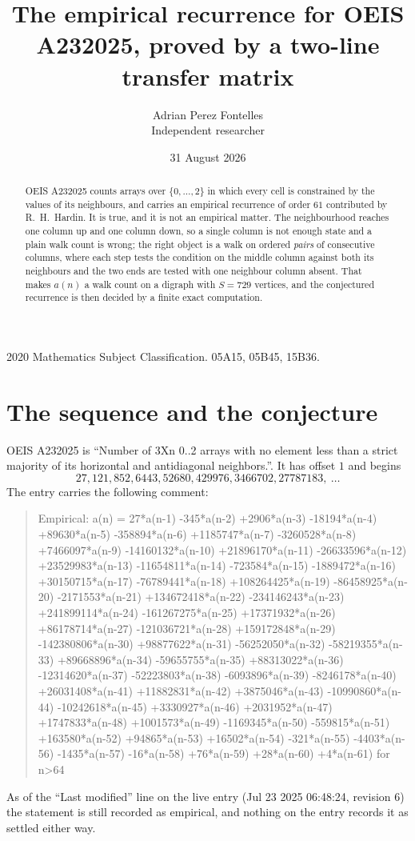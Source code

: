 \documentclass[11pt,a4paper]{article}
\title{The empirical recurrence for OEIS A232025, proved by a two-line transfer matrix}
\author{Adrian Perez Fontelles\\ \small Independent researcher}
\date{31 August 2026}
\theoremstyle{plain}
\theoremstyle{definition}
\begin{document}
\maketitle

\begin{abstract}
OEIS A232025 counts arrays over $\{0,\dots,2\}$ in which every cell is constrained by the
values of its neighbours, and carries an empirical recurrence of order $61$ contributed
by R.~H.~Hardin. It is true, and it is not an empirical matter. The neighbourhood reaches one
column up and one column down, so a single column is not enough state and a plain walk count
is wrong; the right object is a walk on ordered \emph{pairs} of consecutive columns, where
each step tests the condition on the middle column against both its neighbours and the two
ends are tested with one neighbour column absent. That makes $a(n)$ a walk count on a digraph
with $S=729$ vertices, and the conjectured recurrence is then decided by a finite exact
computation.
\end{abstract}

\noindent\small 2020 Mathematics Subject Classification. 05A15, 05B45, 15B36.\normalsize

\section{The sequence and the conjecture}

OEIS A232025 is ``Number of 3Xn 0..2 arrays with no element less than a strict majority of its horizontal and antidiagonal neighbors.''. It has offset $1$ and begins
\[
27, 121, 852, 6443, 52680, 429976, 3466702, 27787183,\ \dots
\]
The entry carries the following comment:
\begin{quote}\small
Empirical: a(n) = 27*a(n-1) -345*a(n-2) +2906*a(n-3) -18194*a(n-4) +89630*a(n-5) -358894*a(n-6) +1185747*a(n-7) -3260528*a(n-8) +7466097*a(n-9) -14160132*a(n-10) +21896170*a(n-11) -26633596*a(n-12) +23529983*a(n-13) -11654811*a(n-14) -723584*a(n-15) -1889472*a(n-16) +30150715*a(n-17) -76789441*a(n-18) +108264425*a(n-19) -86458925*a(n-20) -2171553*a(n-21) +134672418*a(n-22) -234146243*a(n-23) +241899114*a(n-24) -161267275*a(n-25) +17371932*a(n-26) +86178714*a(n-27) -121036721*a(n-28) +159172848*a(n-29) -142380806*a(n-30) +98877622*a(n-31) -56252050*a(n-32) -58219355*a(n-33) +89668896*a(n-34) -59655755*a(n-35) +88313022*a(n-36) -12314620*a(n-37) -52223803*a(n-38) -6093896*a(n-39) -8246178*a(n-40) +26031408*a(n-41) +11882831*a(n-42) +3875046*a(n-43) -10990860*a(n-44) -10242618*a(n-45) +3330927*a(n-46) +2031952*a(n-47) +1747833*a(n-48) +1001573*a(n-49) -1169345*a(n-50) -559815*a(n-51) +163580*a(n-52) +94865*a(n-53) +16502*a(n-54) -321*a(n-55) -4403*a(n-56) -1435*a(n-57) -16*a(n-58) +76*a(n-59) +28*a(n-60) +4*a(n-61) for n>64
\end{quote}
As of the ``Last modified'' line on the live entry (Jul 23 2025 06:48:24, revision 6) the statement is
still recorded as empirical, and nothing on the entry records it as settled either way.
\end{document}
